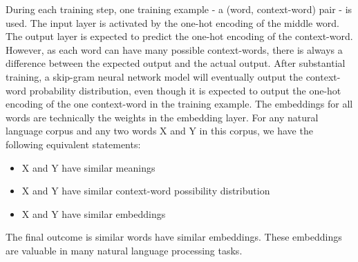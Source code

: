 \documentclass[conference]{IEEEtran}
\begin{document}
During each training step, one training example - a (word, context-word) pair - is used.
The input layer is activated by the one-hot encoding of the middle word.
The output layer is expected to predict the one-hot encoding of the context-word.
However, as each word can have many possible context-words, there is always a difference between the expected output and the actual output.
After substantial training, a skip-gram neural network model will eventually output the context-word probability distribution,
even though it is expected to output the one-hot encoding of the one context-word in the training example.
The embeddings for all words are technically the weights in the embedding layer.
For any natural language corpus and any two words X and Y in this corpus, we have the following equivalent statements:
\begin{itemize}
	\item X and Y have similar meanings
	\item X and Y have similar context-word possibility distribution 
	\item X and Y have similar embeddings
\end{itemize}
The final outcome is similar words have similar embeddings.
These embeddings are valuable in many natural language processing tasks.
\end{document}
